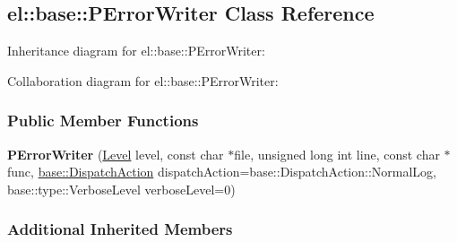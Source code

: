 \hypertarget{a00068}{}\subsection{el\+:\+:base\+:\+:P\+Error\+Writer Class Reference}
\label{a00068}


Inheritance diagram for el\+:\+:base\+:\+:P\+Error\+Writer\+:


Collaboration diagram for el\+:\+:base\+:\+:P\+Error\+Writer\+:
\subsubsection*{Public Member Functions}
\begin{DoxyCompactItemize}
\item 
\hypertarget{a00068_a60d1ff92d16e3927e2c4b5bb77d34092}{}{\bfseries P\+Error\+Writer} (\hyperlink{a00183_ab0ac6091262344c52dd2d3ad099e8e36}{Level} level, const char $\ast$file, unsigned long int line, const char $\ast$func, \hyperlink{a00184_a3aa2563d38e47388ba242a1694fc2839}{base\+::\+Dispatch\+Action} dispatch\+Action=base\+::\+Dispatch\+Action\+::\+Normal\+Log, base\+::type\+::\+Verbose\+Level verbose\+Level=0)\label{a00068_a60d1ff92d16e3927e2c4b5bb77d34092}

\end{DoxyCompactItemize}
\subsubsection*{Additional Inherited Members}
